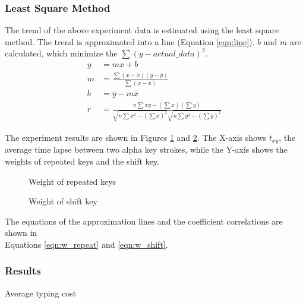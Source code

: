 \documentclass[english]{jnlp_1.3e}
\begin{document}
    \subsubsection*{Least Square Method}
The trend of the above experiment data is estimated using the least square method. The trend is approximated into a line (Equation \ref{eqn:line}). $b$ and $m$ are calculated,  which minimize the $\sum{(y-actual\_data)^2}$.
\begin{align}
 y&=mx+b\label{eqn:line}\\
 m&=\frac{\sum{(x-\overline{x})(y-\overline{y})}}{\sum{(x-\overline{x})}}\\
 b&=\overline{y}-m\overline{x}\\
 r&=\frac{n\sum{xy}-(\sum{x})(\sum{y})}{\sqrt{n\sum{x^2}-(\sum{x})^2}\sqrt{n\sum{y^2}-(\sum{y})^2}} 
\end{align}

The experiment results are shown in  Figures  \ref{fig:w_repeat}  and \ref{fig:w_shift}. 
 The  X-axis shows $t_{xy}$, the average time lapse between two alpha key strokes, while  the  Y-axis shows the weights of repeated keys and the shift key.

\begin{figure}[b]

  \caption{Weight of repeated keys}
  \label{fig:w_repeat}
\end{figure}

\begin{figure}[t]

  \caption{Weight of shift key}
  \label{fig:w_shift}
\end{figure}

The equations of the approximation  lines and  the coefficient correlations are shown in  \\Equations \ref{eqn:w_repeat} and \ref{eqn:w_shift}.



    \subsubsection*{Results}

\begin{table}[b]
\centering
\caption{Average typing cost}

\label{tabl:weight}
\end{table}
\end{document}
